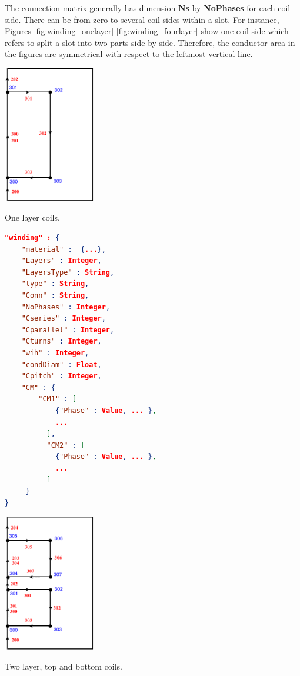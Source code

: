 \documentclass[justified]{tufte-book} %
\begin{document}
The connection matrix generally has dimension \textbf{Ns} by \textbf{NoPhases} for each coil side. There can be from zero to several coil sides within a slot. For instance, Figures \ref{fig:winding_onelayer}-\ref{fig:winding_fourlayer} show one coil side which refers to split a slot into two parts side by side. Therefore, the conductor area in the figures are symmetrical with respect to the leftmost vertical line.


\begin{marginfigure}
\includegraphics[width=4cm]{winding_onelayer.pdf}
\caption{One layer coils.}
\label{fig:winding_onelayer}
\end{marginfigure}

\begin{lstlisting}[language=json]
"winding" : {
	"material" :  {...},
	"Layers" : Integer,
	"LayersType" : String,
	"type" : String,
	"Conn" : String,
	"NoPhases" : Integer,
	"Cseries" : Integer,
	"Cparallel" : Integer,
	"Cturns" : Integer,
	"wih" : Integer,
	"condDiam" : Float,
	"Cpitch" : Integer,
	"CM" : {
		"CM1" : [
			{"Phase" : Value, ... },
            ...
          ],
          "CM2" : [
          	{"Phase" : Value, ... },
          	...
          ]
	 }
}
\end{lstlisting}


\begin{marginfigure}
\includegraphics[width=4cm]{winding_twolayer_topbottom.pdf}
\caption{Two layer, top and bottom coils.}
\label{fig:winding_twolayer_topbottom}
\end{marginfigure}
\end{document}
